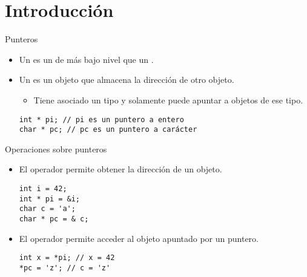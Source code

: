 \section{Introducción}

\begin{frame}[t,fragile]{Punteros}
\begin{itemize}
  \item Un  es un  de más bajo 
        nivel que un .

  \item Un  es un objeto que almacena la dirección de otro objeto.
    \begin{itemize}
      \item Tiene asociado un tipo y solamente puede apuntar a objetos de ese tipo.
    \end{itemize}
\begin{lstlisting}
int * pi; // pi es un puntero a entero
char * pc; // pc es un puntero a carácter
\end{lstlisting}
\end{itemize}
\end{frame}

\begin{frame}[t,fragile]{Operaciones sobre punteros}
\begin{itemize}
  \item El operador \cppkey{\&} permite obtener la dirección de un objeto.
\begin{lstlisting}
int i = 42;
int * pi = &i;
char c = 'a';
char * pc = & c;
\end{lstlisting}

  \item El operador \cppkey{*} permite acceder al objeto apuntado por un puntero.
\begin{lstlisting}
int x = *pi; // x = 42
*pc = 'z'; // c = 'z'
\end{lstlisting}
\end{itemize}
\end{frame}
